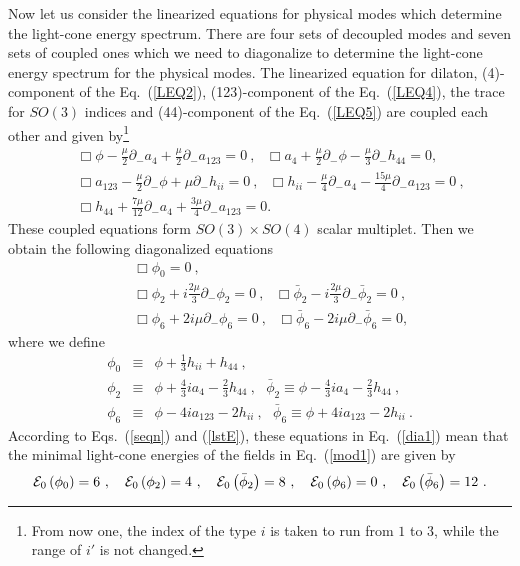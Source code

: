 \documentclass[a4paper,12pt]{article}
\numberwithin{equation}{section}
\begin{document}
Now let us consider the linearized equations for physical modes which
determine the light-cone energy spectrum.  There are four sets of
decoupled modes and seven sets of coupled ones which we need to
diagonalize to determine the light-cone energy spectrum for the
physical modes.  The linearized equation for dilaton, (4)-component of
the Eq.~(\ref{LEQ2}), (123)-component of the Eq.~(\ref{LEQ4}), the
trace for $SO(3)$ indices and (44)-component of the Eq.~(\ref{LEQ5})
are coupled each other and given by\footnote{From now one, the index
  of the type $i$ is taken to run from $1$ to $3$, while the range of
  $i'$ is not changed.}
\begin{eqnarray}
&& \Box \phi - \frac{\mu}2\partial_- a_4
             + \frac{\mu}2 \partial_- a_{123} = 0 ~,~~~
   \Box a_4 + \frac{\mu}2\partial_-\phi
             - \frac{\mu}3 \partial_- h_{44} = 0,
\nonumber \\
&& \Box a_{123} - \frac{\mu}2\partial_- \phi
               + \mu \partial_- h_{ii} = 0 ~,~~~
   \Box h_{ii} - \frac{\mu}4 \partial_- a_4
               - \frac{15\mu}4 \partial_- a_{123} = 0 ~,
\nonumber \\
&& \Box h_{44} + \frac{7\mu}{12} \partial_- a_4
               + \frac{3\mu}4\partial_- a_{123} = 0.
\label{coup1}
\end{eqnarray}
These coupled equations form $SO(3)\times SO(4)$ scalar multiplet.
Then we obtain the following diagonalized equations
\begin{eqnarray}
& & \Box \phi_0 = 0 ~,
  \nonumber \\
& & \Box \phi_2 + i \frac{2\mu}{3}
        \partial_- \phi_2 = 0 ~,~~~
    \Box \bar\phi_2 - i \frac{2\mu}{3}
        \partial_- \bar\phi_2 = 0 ~,
  \nonumber \\
& & \Box\phi_6 + 2i \mu \partial_- \phi_6 = 0 ~,~~~
    \Box \bar\phi_6 - 2i \mu \partial_- \bar\phi_6 = 0,
\label{dia1}
\end{eqnarray}
where we define
\begin{eqnarray}
\phi_0 &\equiv&  \phi + \frac13 h_{ii} + h_{44} ~,
  \nonumber \\
\phi_2 &\equiv& \phi + \frac43 i a_4 - \frac23 h_{44} ~,~~~
\bar\phi_2 \equiv \phi - \frac43 i a_4 - \frac23 h_{44} ~,
  \nonumber \\
\phi_6 &\equiv& \phi - 4 i a_{123} - 2 h_{ii} ~,~~~
    \bar\phi_6 \equiv \phi + 4 i a_{123} - 2 h_{ii} ~.
\label{mod1}
\end{eqnarray}
According to Eqs.~(\ref{seqn}) and (\ref{lstE}), these equations in
Eq.~(\ref{dia1}) mean that the minimal light-cone energies of the
fields in Eq.~(\ref{mod1}) are given by
\begin{equation}\label{eng1}
{\cal E}_0\left( \phi_0 \right) = 6 ~,~~~
{\cal E}_0\left(\phi_2 \right) = 4 ~,~~~
{\cal E}_0\left( \bar\phi_2\right) = 8 ~,~~~
{\cal E}_0\left( \phi_6 \right) = 0 ~,~~~
{\cal E}_0\left( \bar\phi_6 \right) = 12 ~.
\end{equation}
\end{document}
